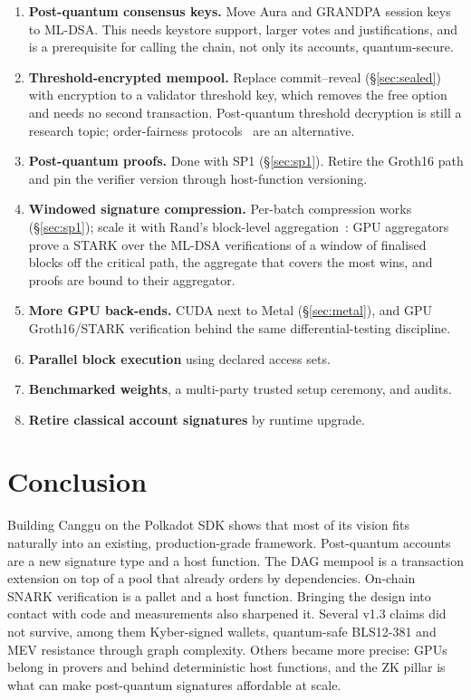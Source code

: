 \documentclass[11pt]{article}
\theoremstyle{definition}
\theoremstyle{remark}
\begin{document}
\begin{enumerate}[leftmargin=*]
  \item \textbf{Post-quantum consensus keys.} Move Aura and GRANDPA session keys to ML-DSA. This
        needs keystore support, larger votes and justifications, and is a prerequisite for
        calling the chain, not only its accounts, quantum-secure.
  \item \textbf{Threshold-encrypted mempool.} Replace commit--reveal (\S\ref{sec:sealed}) with
        encryption to a validator threshold key, which removes the free option and needs no
        second transaction. Post-quantum threshold decryption is still a research topic;
        order-fairness protocols~\cite{aequitas} are an alternative.
  \item \textbf{Post-quantum proofs.} Done with SP1 (\S\ref{sec:sp1}). Retire the Groth16 path and
        pin the verifier version through host-function versioning.
  \item \textbf{Windowed signature compression.} Per-batch compression works
        (\S\ref{sec:sp1}); scale it with Rand's block-level aggregation~\cite{rand}: GPU aggregators prove a STARK over the ML-DSA verifications of a
        window of finalised blocks off the critical path, the aggregate that covers the most wins,
        and proofs are bound to their aggregator.
  \item \textbf{More GPU back-ends.} CUDA next to Metal (\S\ref{sec:metal}), and GPU Groth16/STARK
        verification behind the same differential-testing discipline.
  \item \textbf{Parallel block execution} using declared access sets.
  \item \textbf{Benchmarked weights}, a multi-party trusted setup ceremony, and audits.
  \item \textbf{Retire classical account signatures} by runtime upgrade.
\end{enumerate}

\section{Conclusion}

Building Canggu on the Polkadot SDK shows that most of its vision fits naturally into an existing,
production-grade framework. Post-quantum accounts are a new signature type and a host function.
The DAG mempool is a transaction extension on top of a pool that already orders by dependencies.
On-chain SNARK verification is a pallet and a host function. Bringing the design into contact with
code and measurements also sharpened it. Several v1.3 claims did not survive, among them
Kyber-signed wallets, quantum-safe BLS12-381 and MEV resistance through graph complexity. Others
became more precise: GPUs belong in provers and behind deterministic host functions, and the ZK
pillar is what can make post-quantum signatures affordable at scale.
\end{document}
